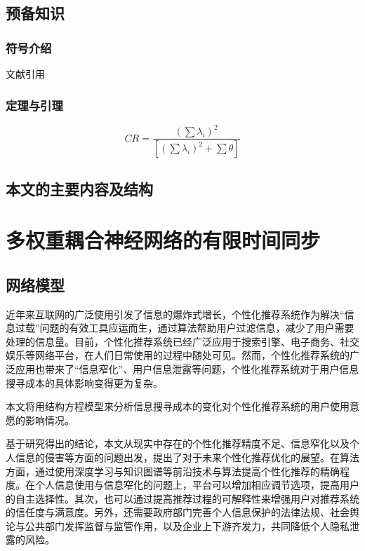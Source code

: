\documentclass[a4paper,zihao=-4,UTF8]{ctexart}
\numberwithin{equation}{section}
\begin{document}
	\subsection{预备知识}
		\subsubsection{符号介绍}
		文献引用\cite{孙鲁平2016网上个性化推荐研究述评与展望}
		\subsubsection{定理与引理}
		\begin{equation}
			CR=\frac{\left (  \sum \lambda _{i}\right )^{2}}{\left [\left (  \sum \lambda _{i}\right )^{2}+\sum \theta   \right ]}
		\end{equation}
\subsection{本文的主要内容及结构}

\section{多权重耦合神经网络的有限时间同步}
	\subsection{网络模型}
	近年来互联网的广泛使用引发了信息的爆炸式增长，个性化推荐系统作为解决“信息过载”问题的有效工具应运而生，通过算法帮助用户过滤信息，减少了用户需要处理的信息量。目前，个性化推荐系统已经广泛应用于搜索引擎、电子商务、社交娱乐等网络平台，在人们日常使用的过程中随处可见。然而，个性化推荐系统的广泛应用也带来了“信息窄化”、用户信息泄露等问题，个性化推荐系统对于用户信息搜寻成本的具体影响变得更为复杂。
	
	本文将用结构方程模型来分析信息搜寻成本的变化对个性化推荐系统的用户使用意愿的影响情况。
	
	基于研究得出的结论，本文从现实中存在的个性化推荐精度不足、信息窄化以及个人信息的侵害等方面的问题出发，提出了对于未来个性化推荐优化的展望。在算法方面，通过使用深度学习与知识图谱等前沿技术与算法提高个性化推荐的精确程度。在个人信息使用与信息窄化的问题上，平台可以增加相应调节选项，提高用户的自主选择性。其次，也可以通过提高推荐过程的可解释性来增强用户对推荐系统的信任度与满意度。另外，还需要政府部门完善个人信息保护的法律法规、社会舆论与公共部门发挥监督与监管作用，以及企业上下游齐发力，共同降低个人隐私泄露的风险。
\end{document}
